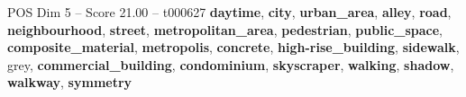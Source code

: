 \begin{textsample}{POS Dim 5 – Score 21.00 – t000627}  \label{ex:f5_pos_008}
\textbf{daytime}, \textbf{city}, \textbf{urban\_area}, \textbf{alley}, \textbf{road}, \textbf{neighbourhood}, \textbf{street}, \textbf{metropolitan\_area}, \textbf{pedestrian}, \textbf{public\_space}, \textbf{composite\_material}, \textbf{metropolis}, \textbf{concrete}, \textbf{high-rise\_building}, \textbf{sidewalk}, grey, \textbf{commercial\_building}, \textbf{condominium}, \textbf{skyscraper}, \textbf{walking}, \textbf{shadow}, \textbf{walkway}, \textbf{symmetry}

\end{textsample}
